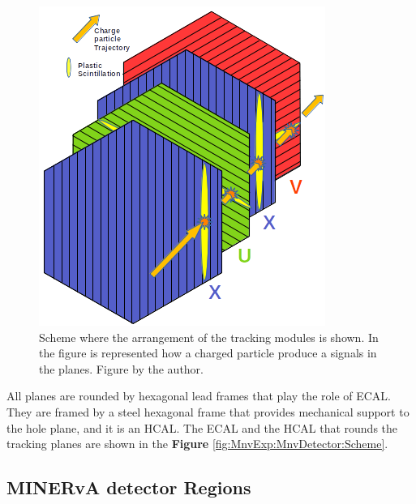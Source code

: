\begin{figure}[!htb]
\centering
\includegraphics[scale=0.5]{Figures/Chapter2/TrackingModules.png}

        \caption{Scheme where the arrangement of the tracking modules is shown. In the figure is represented how a charged particle produce a signals in the planes. Figure by the author.} 
\label{fig:MnvExp:MnvDetector:TrackingModules}
\end{figure}

All planes are rounded by hexagonal lead frames that play the role of ECAL. They are framed by a steel hexagonal frame that provides mechanical support to the hole plane, and it is an HCAL. The ECAL and the HCAL that rounds the tracking planes are shown in the \textbf{Figure} \ref{fig:MnvExp:MnvDetector:Scheme}.

\subsection{MINERvA detector Regions}
\label{Cap:MnvExp:MnvDetector:MnvDetectorRegions} 

